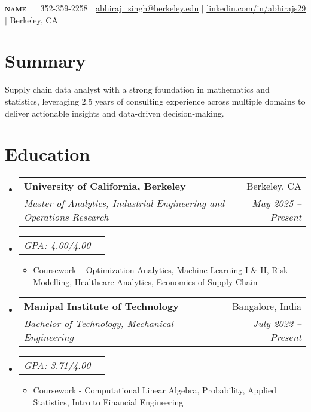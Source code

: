 \documentclass[letterpaper,11pt]{article}
\makeatletter
\newcommand{\resumeItem}[1]{
  \item\small{
    {#1 \vspace{-2pt}}
  }
}
\newcommand{\resumeSubheading}[4]{
  \vspace{-2pt}\item
    \begin{tabular*}{0.97\textwidth}[t]{l@{\extracolsep{\fill}}r}
      \textbf{#1} & #2 \\
      \textit{\small#3} & \textit{\small #4} \\
    \end{tabular*}\vspace{-7pt}
}
\newcommand{\resumeSubSubheading}[2]{
    \item
    \begin{tabular*}{0.97\textwidth}{l@{\extracolsep{\fill}}r}
      \textit{\small#1} & \textit{\small #2} \\
    \end{tabular*}\vspace{-7pt}
}
\newcommand{\resumeSubHeadingListStart}{\begin{itemize}[leftmargin=0.15in, label={}]}
\newcommand{\resumeSubHeadingListEnd}{\end{itemize}}
\newcommand{\resumeItemListStart}{\begin{itemize}}
\newcommand{\resumeItemListEnd}{\end{itemize}\vspace{-5pt}}
\makeatother
\begin{document}
\setlength{\pdfpageheight}{14.00in}

\begin{center}
    \textbf{{\Huge \scshape {name}}} \ \ \vspace{1pt}
    \small 352-359-2258 $|$ \href{mailto:abhiraj_singh@berkeley.edu}{\underline{{abhiraj\_singh@berkeley.edu}}} $|$ \href{{https://linkedin.com/in/abhirajs29}}{\underline{{linkedin.com/in/abhirajs29}}} $|$ Berkeley, CA
\end{center}

\section*{Summary} %
  Supply chain data analyst with a strong foundation in mathematics and statistics, leveraging 2.5 years of consulting experience across multiple domains to deliver actionable insights and data-driven decision-making.

\section{Education}
  \resumeSubHeadingListStart
    \resumeSubheading
      {University of California, Berkeley}{Berkeley, CA}
      {Master of Analytics, Industrial Engineering and Operations Research}{May 2025 -- Present}
    \resumeSubSubheading{GPA: 4.00/4.00}{}
      \resumeItemListStart
        \resumeItem{Coursework – Optimization Analytics, Machine Learning I \& II, Risk Modelling, Healthcare Analytics, Economics of Supply Chain}
      \resumeItemListEnd
    \resumeSubheading
      {Manipal Institute of Technology}{Bangalore, India}
      {Bachelor of Technology, Mechanical Engineering}{July 2022 -- Present}
    \resumeSubSubheading{GPA: 3.71/4.00}{}
      \resumeItemListStart
        \resumeItem{Coursework - Computational Linear Algebra, Probability, Applied Statistics, Intro to Financial Engineering}
      \resumeItemListEnd
  \resumeSubHeadingListEnd
\end{document}
